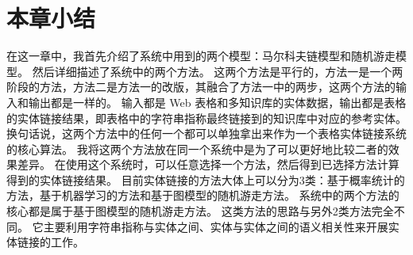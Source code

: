 \section{本章小结}
在这一章中，我首先介绍了系统中用到的两个模型：马尔科夫链模型和随机游走模型。
然后详细描述了系统中的两个方法。
这两个方法是平行的，方法一是一个两阶段的方法，方法二是方法一的改版，其融合了方法一中的两步，这两个方法的输入和输出都是一样的。
输入都是 Web 表格和多知识库的实体数据，输出都是表格的实体链接结果，即表格中的字符串指称最终链接到的知识库中对应的参考实体。
换句话说，这两个方法中的任何一个都可以单独拿出来作为一个表格实体链接系统的核心算法。
我将这两个方法放在同一个系统中是为了可以更好地比较二者的效果差异。
在使用这个系统时，可以任意选择一个方法，然后得到已选择方法计算得到的实体链接结果。
目前实体链接的方法大体上可以分为3类：基于概率统计的方法，基于机器学习的方法和基于图模型的随机游走方法。
系统中的两个方法的核心都是属于基于图模型的随机游走方法。
这类方法的思路与另外2类方法完全不同。
它主要利用字符串指称与实体之间、实体与实体之间的语义相关性来开展实体链接的工作。

